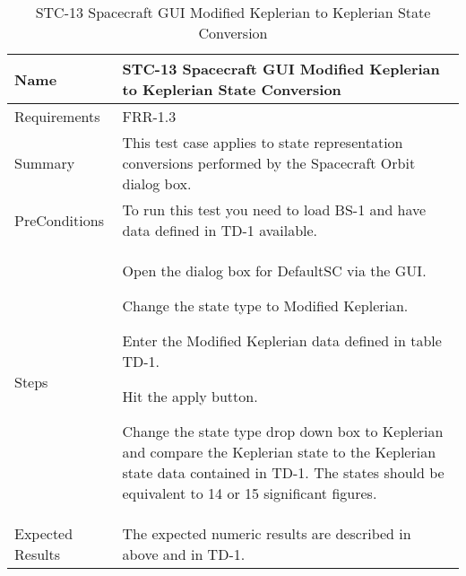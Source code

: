 \begin{table}[htbp!]
\centering
      \begin{tabular}{|p{1.05 in} |p{4.75 in} |}
      \hline
         \rowcolor[rgb]{0.8,0.8,0.8} Name & STC-13 Spacecraft GUI Modified Keplerian to Keplerian State Conversion\\
         \hline
         Requirements & FRR-1.3\\ \hline
         Summary &
         This test case applies to state representation conversions performed by the Spacecraft Orbit dialog box.  \\
         \hline
         PreConditions & To run this test you need to load BS-1 and have data defined in TD-1 available.\\
         \hline
         Steps &
         \begin{compactenum}
         \item Open the dialog box for DefaultSC via the GUI.
         \item Change the state type to Modified Keplerian.
         \item Enter the Modified Keplerian data defined in table TD-1.
         \item Hit the apply button.
         \item Change the state type drop down box to Keplerian and compare the Keplerian state to the
         Keplerian state data contained in TD-1. The states should be equivalent to 14 or 15 significant figures.
         \end{compactenum}\\
         \hline
         Expected Results & The expected numeric results are described in above and in TD-1.\\
      \hline
\end{tabular}
      \label{Table: STC-13}
      \caption{STC-13 Spacecraft GUI Modified Keplerian to Keplerian State Conversion}
\end{table} 